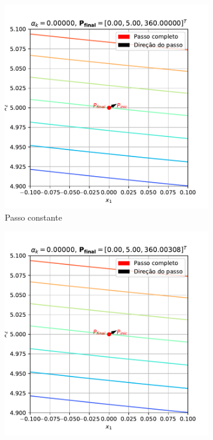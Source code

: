 \documentclass[10pt, a4paper]{article}
\begin{document}
\begin{figure}
  \centering
  \begin{subfigure}[b]{0.32\textwidth}
      \centering
      \includegraphics[width=\textwidth]{images/q2c_1.pdf}
      \caption{Passo constante}
      \label{fig:q2c_1}
  \end{subfigure}
  \hfill
  \begin{subfigure}[b]{0.32\textwidth}
      \centering
      \includegraphics[width=\textwidth]{images/q2c_2.pdf}

\end{subfigure}
\end{figure}
\end{document}
